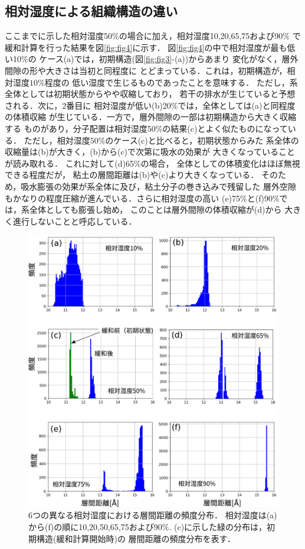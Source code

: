 \subsection{相対湿度による組織構造の違い}
ここまでに示した相対湿度50$\%$の場合に加え，相対湿度10,20,65,75および90$\%$
で緩和計算を行った結果を図\ref{fig:fig4}に示す．
図\ref{fig:fig4}の中で相対湿度が最も低い10$\%$の
ケース(a)では，初期構造(図\ref{fig:fig3}-(a))からあまり
変化がなく，層外間隙の形や大きさは当初と同程度に
とどまっている．これは，初期構造が，相対湿度$10\%$程度の
低い湿度で生じるものであったことを意味する．
ただし，系全体としては初期状態からやや収縮しており，
若干の排水が生じていると予想される．次に，2番目に
相対湿度が低い(b)20$\%$では，全体としては(a)と同程度の体積収縮
が生じている．一方で，層外間隙の一部は初期構造から大きく収縮する
ものがあり，分子配置は相対湿度50$\%$の結果(c)とよく似たものになっている．
ただし，相対湿度$50\%$のケース(c)と比べると，初期状態からみた
系全体の収縮量は(b)が大きく，(b)から(c)で次第に吸水の効果が
大きくなっていることが読み取れる．
これに対して(d)65$\%$の場合，
全体としての体積変化はほぼ無視できる程度だが，
粘土の層間距離は(b)や(c)より大きくなっている．
そのため，吸水膨張の効果が系全体に及び，粘土分子の巻き込みで残留した
層外空隙もかなりの程度圧縮が進んでいる．さらに相対湿度の高い
(e)75$\%$と(f)90$\%$では，系全体としても膨張し始め，
このことは層外間隙の体積収縮が(d)から
大きく進行しないことと呼応している．\\
\begin{figure}
	\begin{center}
	\includegraphics[width=1.0\linewidth]{Figs/fig5.pdf} 
	\end{center}
	\caption{
		6つの異なる相対湿度における層間距離の頻度分布．
		相対湿度は(a)から(f)の順に10,20,50,65,75および90$\%$. 
		(c)に示した緑の分布は，初期構造(緩和計算開始時)の
		層間距離の頻度分布を表す．
	} 
	\label{fig:fig5}
\end{figure}
